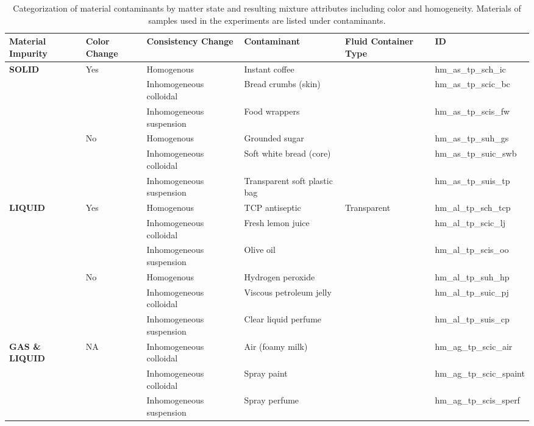 \documentclass[12pt,a4paper,oneside]{report}
\begin{document}
\begin{table}
    \centering
    \footnotesize
    \begin{tabularx}{\textwidth}{p{1.8cm}p{1.5cm}p{2.5cm}Xp{1.8cm}X}
    \toprule
    \textbf{Material Impurity} & \textbf{Color Change} & \textbf{Consistency Change} & \textbf{Contaminant} & \textbf{Fluid Container Type} & \textbf{ID} \\
    \midrule
    \multirow{6}{*}{\textbf{SOLID}} & \multirow{3}{*}{Yes} & Homogenous & Instant coffee & & hm\_as\_tp\_sch\_ic \\
    \cmidrule{3-6}
    & & Inhomogeneous colloidal & Bread crumbs (skin) & & hm\_as\_tp\_scic\_bc \\
    \cmidrule{3-6}
    & & Inhomogeneous suspension & Food wrappers & & hm\_as\_tp\_scis\_fw \\
    \cmidrule{2-6}
    & \multirow{3}{*}{No} & Homogenous & Grounded sugar & & hm\_as\_tp\_suh\_gs \\
    \cmidrule{3-6}
    & & Inhomogeneous colloidal & Soft white bread (core) & & hm\_as\_tp\_suic\_swb \\
    \cmidrule{3-6}
    & & Inhomogeneous suspension & Transparent soft plastic bag & & hm\_as\_tp\_suis\_tp \\
    \midrule
    \multirow{6}{*}{\textbf{LIQUID}} & \multirow{3}{*}{Yes} & Homogenous & TCP antiseptic & \multirow{6}{*}{Transparent} & hm\_al\_tp\_sch\_tcp \\
    \cmidrule{3-4}\cmidrule{6-6}
    & & Inhomogeneous colloidal & Fresh lemon juice & & hm\_al\_tp\_scic\_lj \\
    \cmidrule{3-4}\cmidrule{6-6}
    & & Inhomogeneous suspension & Olive oil & & hm\_al\_tp\_scis\_oo \\
    \cmidrule{2-4}\cmidrule{6-6}
    & \multirow{3}{*}{No} & Homogenous & Hydrogen peroxide & & hm\_al\_tp\_suh\_hp \\
    \cmidrule{3-4}\cmidrule{6-6}
    & & Inhomogeneous colloidal & Viscous petroleum jelly & & hm\_al\_tp\_suic\_pj \\
    \cmidrule{3-4}\cmidrule{6-6}
    & & Inhomogeneous suspension & Clear liquid perfume & & hm\_al\_tp\_suis\_cp \\
    \midrule
    \multirow{3}{*}{\textbf{GAS \& LIQUID}} & \multirow{3}{*}{NA} & Inhomogeneous colloidal & Air (foamy milk) & & hm\_ag\_tp\_scic\_air \\
    \cmidrule{3-6}
    & & Inhomogeneous colloidal & Spray paint & & hm\_ag\_tp\_scic\_spaint \\
    \cmidrule{3-6}
    & & Inhomogeneous suspension & Spray perfume & & hm\_ag\_tp\_scis\_sperf \\
    \bottomrule
    \end{tabularx}
    \caption{Categorization of material contaminants by matter state and resulting mixture attributes including color and homogeneity. Materials of samples used in the experiments are listed under contaminants.}
    \label{tab:6_1}
\end{table}
\end{document}
